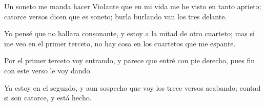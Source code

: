 \startlines
Un soneto me manda hacer Violante
que en mi vida me he visto en tanto aprieto;
catorce versos dicen que es soneto;
burla burlando van los tres delante.

Yo pensé que no hallara consonante,
y estoy a la mitad de otro cuarteto;
mas si me veo en el primer terceto,
no hay cosa en los cuartetos que me espante.

Por el primer terceto voy entrando,
y parece que entré con pie derecho,
pues fin con este verso le voy dando.

Ya estoy en el segundo, y aun sospecho
que voy los trece versos acabando;
contad si son catorce, y está hecho.
\stoplines
